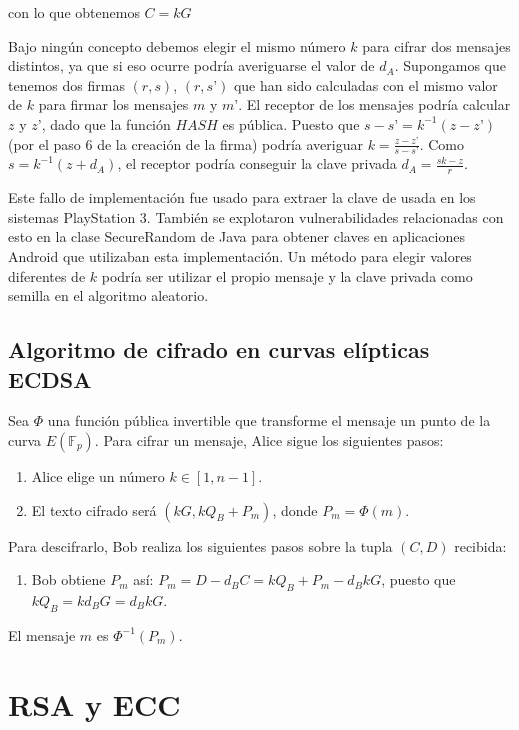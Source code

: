 \documentclass{article}
\begin{document}
con lo que obtenemos $C = kG$

Bajo ningún concepto debemos elegir el mismo número $k$ para cifrar
dos mensajes distintos, ya que si eso ocurre podría averiguarse el
valor de $d_A$. Supongamos que tenemos dos firmas $(r, s)$, $(r,s’)$
que han sido calculadas con el mismo valor de $k$ para firmar los
mensajes $m$ y $m’$. El receptor de los mensajes podría calcular $z$ y
$z’$, dado que la función $HASH$ es pública. Puesto que $s-s’ =
k^{-1}(z-z’)$ (por el paso 6 de la creación de la firma) podría
averiguar $k = \frac{z-z’}{s-s’}$. Como $s = k^{-1}(z+d_A)$, el
receptor podría conseguir la clave privada $d_A = \frac{sk-z}{r}$.

Este fallo de implementación fue usado para extraer la clave de usada
en los sistemas PlayStation 3. También se explotaron vulnerabilidades
relacionadas con esto en la clase SecureRandom de Java para obtener
claves en aplicaciones Android que utilizaban esta implementación. Un
método para elegir valores diferentes de $k$ podría ser utilizar el
propio mensaje y la clave privada como semilla en el algoritmo
aleatorio.

\subsection{Algoritmo de cifrado en curvas elípticas ECDSA}

Sea $\Phi$ una función pública invertible que transforme el mensaje un
punto de la curva $E(\mathbb{F}_p)$. Para cifrar un mensaje, Alice
sigue los siguientes pasos:

\begin{enumerate}
\item Alice elige un número $k \in [1, n-1]$.
\item El texto cifrado será $(kG, kQ_B+P_m)$, donde $P_m = \Phi(m)$.
\end{enumerate}

Para descifrarlo, Bob realiza los siguientes pasos sobre la tupla
$(C,D)$ recibida:

\begin{enumerate}
\item Bob obtiene $P_m$ así: $P_m = D - d_BC = kQ_B + P_m - d_BkG$,
puesto que $kQ_B=kd_BG=d_BkG$.
\end{enumerate}

El mensaje $m$ es $\Phi^{-1}(P_m)$.

\newpage

\section{RSA y ECC}
\end{document}
